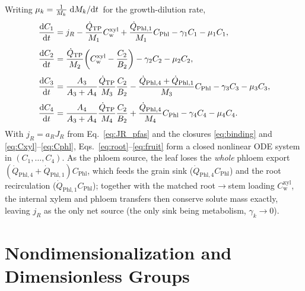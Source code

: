 \documentclass[12pt,a4paper]{article}
\newcommand{\Cw}{C_{\mathrm{w}}}
\begin{document}
Writing $\mu_k=\tfrac{1}{M_k}\dv*{M_k}{t}$ for the growth-dilution rate,
\begin{align}
    \dv{C_1}{t}&=j_R-\frac{\dot Q_\mathrm{TP}}{M_1}\Cw^{\mathrm{xyl}}+\frac{\dot Q_\mathrm{Phl,1}}{M_1}C_\mathrm{Phl}-\gamma_1C_1-\mu_1C_1, \label{eq:root}\\[4pt]
    \dv{C_2}{t}&=\frac{\dot Q_\mathrm{TP}}{M_2}\!\left(\Cw^{\mathrm{xyl}}-\frac{C_2}{B_2}\right)-\gamma_2C_2-\mu_2C_2, \label{eq:stem}\\[4pt]
    \dv{C_3}{t}&=\frac{A_3}{A_3+A_4}\frac{\dot Q_\mathrm{TP}}{M_3}\frac{C_2}{B_2}-\frac{\dot Q_\mathrm{Phl,4}+\dot Q_\mathrm{Phl,1}}{M_3}C_\mathrm{Phl}-\gamma_3C_3-\mu_3C_3, \label{eq:leaf}\\[4pt]
    \dv{C_4}{t}&=\frac{A_4}{A_3+A_4}\frac{\dot Q_\mathrm{TP}}{M_4}\frac{C_2}{B_2}+\frac{\dot Q_\mathrm{Phl,4}}{M_4}C_\mathrm{Phl}-\gamma_4C_4-\mu_4C_4. \label{eq:fruit}
\end{align}
With $j_R=a_RJ_R$ from Eq.~\eqref{eq:JR_pfas} and the closures \eqref{eq:binding} and \eqref{eq:Cxyl}--\eqref{eq:Cphl}, Eqs.~\eqref{eq:root}--\eqref{eq:fruit} form a closed nonlinear ODE system in $(C_1,\dots,C_4)$.  As the phloem source, the leaf loses the \emph{whole} phloem export $(\dot Q_\mathrm{Phl,4}+\dot Q_\mathrm{Phl,1})C_\mathrm{Phl}$, which feeds the grain sink ($\dot Q_\mathrm{Phl,4}C_\mathrm{Phl}$) and the root recirculation ($\dot Q_\mathrm{Phl,1}C_\mathrm{Phl}$); together with the matched root$\to$stem loading $\Cw^{\mathrm{xyl}}$, the internal xylem and phloem transfers then conserve solute mass exactly, leaving $j_R$ as the only net source (the only sink being metabolism, $\gamma_k\to0$).


\section{Nondimensionalization and Dimensionless Groups}\label{sec:nondim}
\end{document}
